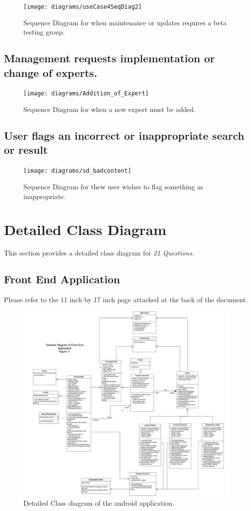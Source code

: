 \documentclass[titlepage]{article}
\begin{document}
\begin{figure}[H]
\texttt{[image: diagrams/useCase4SeqDiag2]}
\caption{Sequence Diagram for when maintenance or updates requires a beta testing group.}\label{sd:survey_of_experts}
\end{figure}
\subsection{Management requests implementation or change of experts.}
\begin{figure}[H]
\texttt{[image: diagrams/Addition\_of\_Expert]}
\caption{Sequence Diagram for when a new expert must be added.}\label{sd:addition_of_expert}
\end{figure}
\subsection{User flags an incorrect or inappropriate search or result}
\begin{figure}[H]
\texttt{[image: diagrams/sd\_badcontent]}
\caption{Sequence Diagram for thew user wishes to flag something as inappropriate.}\label{sd:bad_content}
\end{figure}
\newpage
\section{Detailed Class Diagram}
\label{sec:detailed_class_diagram}
This section provides a detailed class diagram for \textit{21 Questions}.

\subsection{Front End Application}
Please refer to the 11 inch by 17 inch page attached at the back of the document.

\begin{figure}
\includegraphics[scale=0.1]{diagrams/Class_Diagram}
\caption{Detailed Class diagram of the android application.}\label{sd:android_application}
\end{figure}
\end{document}
